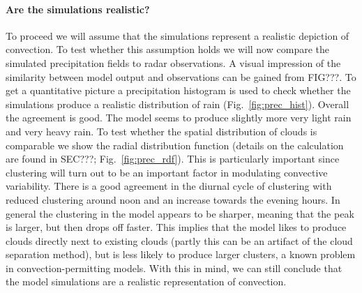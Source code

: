 \documentclass[a4paper, 12pt]{article}
\begin{document}
\paragraph{Are the simulations realistic?} To proceed we will assume that the simulations represent a realistic depiction of convection. To test whether this assumption holds we will now compare the simulated precipitation fields to radar observations. A visual impression of the similarity between model output and observations can be gained from FIG???. To get a quantitative picture a precipitation histogram is used to check whether the simulations produce a realistic distribution of rain (Fig.~\ref{fig:prec_hist}). Overall the agreement is good. The model seems to produce slightly more very light rain and very heavy rain. To test whether the spatial distribution of clouds is comparable we show the radial distribution function (details on the calculation are found in SEC???; Fig.~\ref{fig:prec_rdf}). This is particularly important since clustering will turn out to be an important factor in modulating convective variability. There is a good agreement in the diurnal cycle of clustering with reduced clustering around noon and an increase towards the evening hours. In general the clustering in the model appears to be sharper, meaning that the peak is larger, but then drops off faster. This implies that the model likes to produce clouds directly next to existing clouds (partly this can be an artifact of the cloud separation method), but is less likely to produce larger clusters, a known problem in convection-permitting models. With this in mind, we can still conclude that the model simulations are a realistic representation of convection.  
\end{document}
